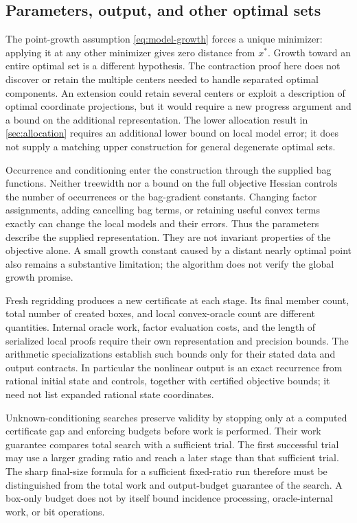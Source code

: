 \subsection{Parameters, output, and other optimal sets}
\label{sec:limitations-parameters}

The point-growth assumption \cref{eq:model-growth} forces a unique
minimizer: applying it at any other minimizer gives zero distance from
$x^*$. Growth toward an entire optimal set is a different hypothesis.
The contraction proof here does not discover or retain the multiple
centers needed to handle separated optimal components. An extension could
retain several centers or exploit a description of optimal coordinate
projections, but it would require a new progress argument and a bound on
the additional representation.
The lower allocation result in \cref{sec:allocation} requires an additional
lower bound on local model error; it does not supply a matching upper
construction for general degenerate optimal sets.

Occurrence and conditioning enter the construction through the supplied
bag functions. Neither treewidth nor a bound on the full objective Hessian
controls the number of occurrences or the bag-gradient constants. Changing
factor assignments, adding cancelling bag terms, or retaining useful convex
terms exactly can change the local models and their errors. Thus the
parameters describe the supplied representation. They are not invariant
properties of the objective alone. A small growth constant caused by a
distant nearly optimal point also remains a substantive limitation; the
algorithm does not verify the global growth promise.

Fresh regridding produces a new certificate at each stage. Its final
member count, total number of created boxes, and local convex-oracle count
are different quantities. Internal oracle work, factor evaluation costs,
and the length of serialized local proofs require their own representation
and precision bounds. The arithmetic specializations establish such bounds
only for their stated data and output contracts. In particular the nonlinear
output is an exact recurrence from rational initial state and controls,
together with certified objective bounds; it need not list expanded rational
state coordinates.

Unknown-conditioning searches preserve validity by stopping only at a
computed certificate gap and enforcing budgets before work is performed.
Their work guarantee compares total search with a sufficient trial. The
first successful trial may use a larger grading ratio and reach a later
stage than that sufficient trial. The sharp final-size formula for a
sufficient fixed-ratio run therefore must be distinguished from the total
work and output-budget guarantee of the search. A box-only budget does not
by itself bound incidence processing, oracle-internal work, or bit
operations.

